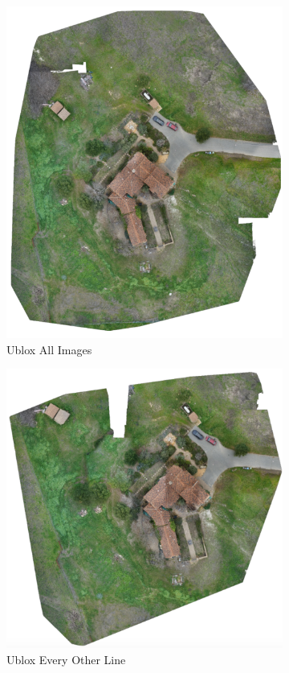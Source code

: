 \documentclass{article}
\begin{document}
\begin{figure}
\begin{subfigure}{.33\textwidth}
  \includegraphics[width=.75\linewidth]{images/orthomosaics/ublox.png}
  \caption{Ublox All Images}
  \label{fig:sub1}
\end{subfigure}%
\begin{subfigure}{.33\textwidth}
  \centering
  \includegraphics[width=.75\linewidth]{images/orthomosaics/ublox_every_other_line.png}
  \caption{Ublox Every Other Line}
  \label{fig:sub2}
\end{subfigure}
\begin{subfigure}{.33\textwidth}
  \centering

\end{subfigure}
\end{figure}
\end{document}
